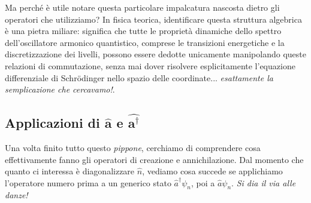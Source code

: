 \begin{approfondimento}[title= {L'algebra di Weyl-Heisenberg}]
    Ma perché è utile notare questa particolare impalcatura nascosta dietro gli operatori che utilizziamo? In fisica teorica, identificare questa struttura algebrica è una pietra miliare: significa che tutte le proprietà dinamiche dello spettro dell'oscillatore armonico quantistico, comprese le transizioni energetiche e la discretizzazione dei livelli, possono essere dedotte unicamente manipolando queste relazioni di commutazione, senza mai dover risolvere esplicitamente l'equazione differenziale di Schrödinger nello spazio delle coordinate... \emph{esattamente la semplicazione che cercavamo!}.
\end{approfondimento}

\subsection{Applicazioni di \texorpdfstring{$\bm{\hat{a}}$}{a} e \texorpdfstring{$\bm{\hat{a^\dagger}}$}{a dagger}}
Una volta finito tutto questo \emph{pippone}, cerchiamo di comprendere cosa effettivamente fanno gli operatori di creazione e annichilazione. Dal momento che quanto ci interessa è diagonalizzare $\hat{n}$, vediamo cosa succede se applichiamo l'operatore numero prima a un generico stato $\hat{a}^\dagger \psi_n$, poi a $\hat{a} \psi_n$. \emph{Si dia il via alle danze!}

